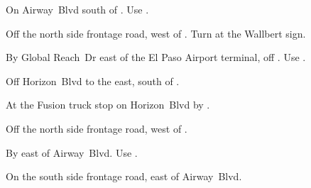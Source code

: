 
\begin{LocationList}

On Airway~Blvd south of .
Use  .

Off the north side  frontage road, west of .
Turn at the Wallbert sign.

By Global Reach~Dr east of the El Paso Airport terminal, off .
Use  .

\Location{\GarageHQ \Garage}
Off  Horizon~Blvd to the east, south of .

At the Fusion truck stop on  Horizon~Blvd by .

Off the north side  frontage road, west of .

By  east of Airway~Blvd.
Use  .

On the south side  frontage road, east of Airway~Blvd.

\end{LocationList}
